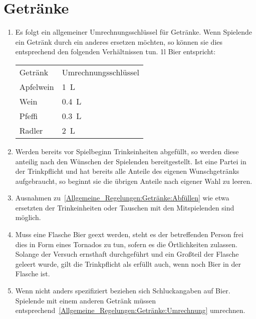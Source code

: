 \section{Getränke}\label{Allgemeine_Regelungen:Getränke}
\begin{enumerate}[label={(\arabic*)}]
	\item\label{Allgemeine_Regelungen:Getränke:Umrechnung}
	Es folgt ein allgemeiner Umrechnungsschlüssel für Getränke.
	Wenn Spielende ein Getränk durch ein anderes ersetzen möchten, so können sie dies entsprechend den folgenden Verhältnissen tun.
	1l Bier entspricht:
	\begin{tabular}{ll}
		\toprule
		Getränk   & Umrechnungsschlüssel \\
		Apfelwein & \SI{1}{\liter} \\
		Wein 	  & \SI{0,4}{\liter} \\
		Pfeffi 	  & \SI{0,3}{\liter} \\
		Radler    & \SI{2}{\liter} \\\bottomrule
	\end{tabular}
	
	\item\label{Allgemeine_Regelungen:Getränke:Abfüllen}
	Werden bereits vor Spielbeginn Trinkeinheiten abgefüllt, so werden diese anteilig nach den Wünschen der Spielenden bereitgestellt.
	Ist eine Partei in der Trinkpflicht und hat bereits alle Anteile des eigenen Wunschgetränks aufgebraucht, so beginnt sie die übrigen Anteile nach eigener Wahl zu leeren.
	
	\item
	Ausnahmen zu~\ref{Allgemeine_Regelungen:Getränke:Abfüllen} wie etwa ersetzten der Trinkeinheiten oder Tauschen mit den Mitspielenden sind möglich.
	
	\item
	Muss eine Flasche Bier geext werden, steht es der betreffenden Person frei dies in Form eines Tornados zu tun, sofern es die Örtlichkeiten zulassen.
	Solange der Versuch ernsthaft durchgeführt und ein Großteil der Flasche geleert wurde, gilt die Trinkpflicht als erfüllt auch, wenn noch Bier in der Flasche ist.
	
	\item
	Wenn nicht anders spezifiziert beziehen sich Schluckangaben auf Bier.
	Spielende mit einem anderen Getränk müssen entsprechend~\ref{Allgemeine_Regelungen:Getränke:Umrechnung} umrechnen.
\end{enumerate}
